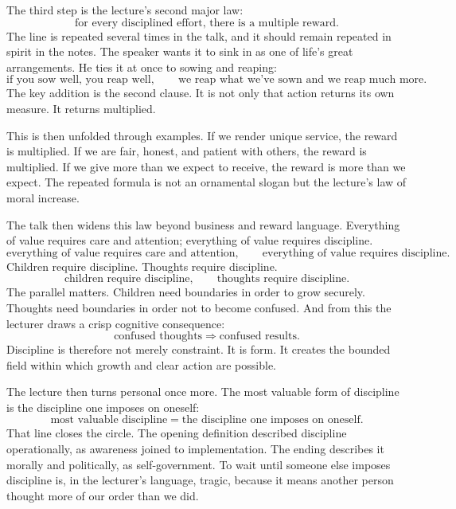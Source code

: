 The third step is the lecture's second major law:
\begin{equation}
\text{for every disciplined effort, there is a multiple reward}.
\end{equation}
The line is repeated several times in the talk, and it should remain repeated in spirit in the notes. The speaker wants it to sink in as one of life's great arrangements. He ties it at once to sowing and reaping:
\begin{equation}
\text{if you sow well, you reap well}, \qquad
\text{we reap what we've sown and we reap much more}.
\end{equation}
The key addition is the second clause. It is not only that action returns its own measure. It returns multiplied.

This is then unfolded through examples. If we render unique service, the reward is multiplied. If we are fair, honest, and patient with others, the reward is multiplied. If we give more than we expect to receive, the reward is more than we expect. The repeated formula is not an ornamental slogan but the lecture's law of moral increase.

The talk then widens this law beyond business and reward language. Everything of value requires care and attention; everything of value requires discipline.
\begin{equation}
\text{everything of value requires care and attention}, \qquad
\text{everything of value requires discipline}.
\end{equation}
Children require discipline. Thoughts require discipline.
\begin{equation}
\text{children require discipline}, \qquad \text{thoughts require discipline}.
\end{equation}
The parallel matters. Children need boundaries in order to grow securely. Thoughts need boundaries in order not to become confused. And from this the lecturer draws a crisp cognitive consequence:
\begin{equation}
\text{confused thoughts} \Rightarrow \text{confused results}.
\end{equation}
Discipline is therefore not merely constraint. It is form. It creates the bounded field within which growth and clear action are possible.

The lecture then turns personal once more. The most valuable form of discipline is the discipline one imposes on oneself:
\begin{equation}
\text{most valuable discipline} = \text{the discipline one imposes on oneself}.
\end{equation}
That line closes the circle. The opening definition described discipline operationally, as awareness joined to implementation. The ending describes it morally and politically, as self-government. To wait until someone else imposes discipline is, in the lecturer's language, tragic, because it means another person thought more of our order than we did.

